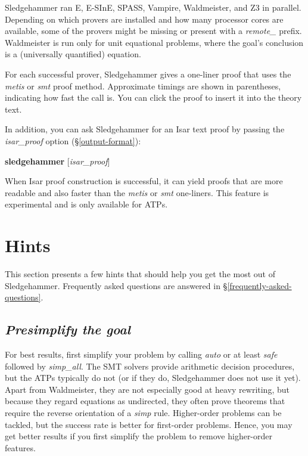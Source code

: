 \documentclass[a4paper,12pt]{article}
\begin{document}
Sledgehammer ran E, E-SInE, SPASS, Vampire, Waldmeister, and Z3 in parallel.
Depending on which provers are installed and how many processor cores are
available, some of the provers might be missing or present with a
\textit{remote\_} prefix. Waldmeister is run only for unit equational problems,
where the goal's conclusion is a (universally quantified) equation.

For each successful prover, Sledgehammer gives a one-liner proof that uses
the \textit{metis} or \textit{smt} proof method. Approximate timings are shown
in parentheses, indicating how fast the call is. You can click the proof to
insert it into the theory text.

In addition, you can ask Sledgehammer for an Isar text proof by passing the
\textit{isar\_proof} option (\S\ref{output-format}):

\prew
\textbf{sledgehammer} [\textit{isar\_proof}]
\postw

When Isar proof construction is successful, it can yield proofs that are more
readable and also faster than the \textit{metis} or \textit{smt} one-liners.
This feature is experimental and is only available for ATPs.

\section{Hints}
\label{hints}

This section presents a few hints that should help you get the most out of
Sledgehammer. Frequently asked questions are answered in
\S\ref{frequently-asked-questions}.

\newcommand\point[1]{\subsection{\emph{#1}}}

\point{Presimplify the goal}

For best results, first simplify your problem by calling \textit{auto} or at
least \textit{safe} followed by \textit{simp\_all}. The SMT solvers provide
arithmetic decision procedures, but the ATPs typically do not (or if they do,
Sledgehammer does not use it yet). Apart from Waldmeister, they are not
especially good at heavy rewriting, but because they regard equations as
undirected, they often prove theorems that require the reverse orientation of a
\textit{simp} rule. Higher-order problems can be tackled, but the success rate
is better for first-order problems. Hence, you may get better results if you
first simplify the problem to remove higher-order features.
\end{document}
